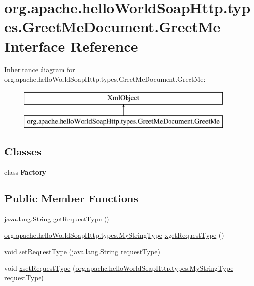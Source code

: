 \hypertarget{interfaceorg_1_1apache_1_1hello_world_soap_http_1_1types_1_1_greet_me_document_1_1_greet_me}{}\section{org.\+apache.\+hello\+World\+Soap\+Http.\+types.\+Greet\+Me\+Document.\+Greet\+Me Interface Reference}
\label{interfaceorg_1_1apache_1_1hello_world_soap_http_1_1types_1_1_greet_me_document_1_1_greet_me}
Inheritance diagram for org.\+apache.\+hello\+World\+Soap\+Http.\+types.\+Greet\+Me\+Document.\+Greet\+Me\+:\begin{figure}[H]
\begin{center}
\leavevmode
\includegraphics[height=2.000000cm]{interfaceorg_1_1apache_1_1hello_world_soap_http_1_1types_1_1_greet_me_document_1_1_greet_me}
\end{center}
\end{figure}
\subsection*{Classes}
\begin{DoxyCompactItemize}
\item 
class {\bfseries Factory}
\end{DoxyCompactItemize}
\subsection*{Public Member Functions}
\begin{DoxyCompactItemize}
\item 
java.\+lang.\+String \hyperlink{interfaceorg_1_1apache_1_1hello_world_soap_http_1_1types_1_1_greet_me_document_1_1_greet_me_ae8976b12b716cf2173e26af6dc1f2354}{get\+Request\+Type} ()
\item 
\hyperlink{interfaceorg_1_1apache_1_1hello_world_soap_http_1_1types_1_1_my_string_type}{org.\+apache.\+hello\+World\+Soap\+Http.\+types.\+My\+String\+Type} \hyperlink{interfaceorg_1_1apache_1_1hello_world_soap_http_1_1types_1_1_greet_me_document_1_1_greet_me_a444bcd603224c64863f96f29827bccf3}{xget\+Request\+Type} ()
\item 
void \hyperlink{interfaceorg_1_1apache_1_1hello_world_soap_http_1_1types_1_1_greet_me_document_1_1_greet_me_af503b58614f53a1ea87e023f9c792625}{set\+Request\+Type} (java.\+lang.\+String request\+Type)
\item 
void \hyperlink{interfaceorg_1_1apache_1_1hello_world_soap_http_1_1types_1_1_greet_me_document_1_1_greet_me_ad8e7e190e58b051d1206098451248f9f}{xset\+Request\+Type} (\hyperlink{interfaceorg_1_1apache_1_1hello_world_soap_http_1_1types_1_1_my_string_type}{org.\+apache.\+hello\+World\+Soap\+Http.\+types.\+My\+String\+Type} request\+Type)
\end{DoxyCompactItemize}
